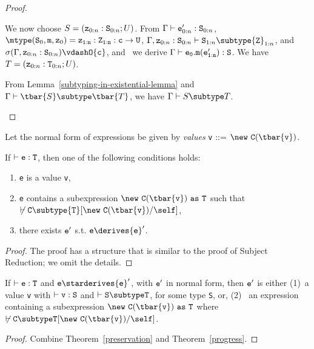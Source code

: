 \begin{proof}
\begin{itemize}
\begin{itemize}
{            We now choose 
               $S=({\tt z}_{0:n}: {\tt S}_{0:n}; U)$.
            From 
            $\Gamma \vdash {\tt e}_{0:n}': {\tt S}_{0:n}$,
            $\mtype({\tt S}_0,{\tt m},{\tt z}_0) =
               \tt {\tt z}_{1:n}: {\tt Z}_{1:n}:c \rightarrow {\tt U}$,
            $\Gamma, {\tt z}_{0:n}: {\tt S}_{0:n} \vdash
                  {\tt S}_{1:n} \subtype {\tt Z}_{1:n}$, and
            $\sigma(\Gamma, {\tt z}_{0:n}: {\tt S}_{0:n}) \vdashO
                  {\tt c}$,
            and \TInvk\ we derive
            $\Gamma \vdash {\tt e_0.m(e_{1:n}')}: {\tt S}$.
            We have 
               $T=({\tt z}_{0:n}: {\tt T}_{0:n}; U)$.

            From Lemma~\ref{subtyping-in-existential-lemma} and
            $\Gamma \vdash \tbar{S} \subtype \tbar{T}$, we have
            $\Gamma \vdash S \subtype T$.
   }
   \end{itemize}
\end{itemize}
\end{proof}

\noindent
Let the normal form of expressions be given by {\em values}
{\tt v} {::=} $\new\ {\tt C(\tbar{v})}$.

\begin{theorem}[Progress] 
\label{progress}
If $\vdash {\tt e: T}$, then one of the following conditions holds:
\begin{enumerate}
\item {\tt e} is a value {\tt v}, 
\item {\tt e} contains a subexpression ${\tt \new\ C(\tbar{v})~as~T}$ such that
$\not\vdash {\tt C} \subtype {\tt T}[{\tt \new\ C(\tbar{v})}/\self]$,
\item there exists ${\tt e}'$ s.t. ${\tt e} \derives {\tt e}'$.
\end{enumerate}
\end{theorem}

\begin{proof}
The proof has a structure that is similar to the proof of Subject Reduction;
we omit the details.
\end{proof}

\begin{theorem} 
\label{type-soundness}
If $\vdash {\tt e: T}$ and ${\tt e} \starderives {\tt e}'$, with ${\tt
e}'$ in normal form, then ${\tt e}'$ is either (1)~a value {\tt v}
with $\vdash {\tt v: S}$ and $\vdash {\tt S \subtype T}$,
for some type {\tt S}, or, (2)~ an expression containing
a subexpression ${\tt \new\ {\tt C(\tbar{v})~as~T}}$ where 
$\not\vdash \tt C\subtype T[\new\ C(\tbar{v})/\self]$.

\end{theorem}

\begin{proof}
Combine Theorem~\ref{preservation} and Theorem~\ref{progress}.
\end{proof}

